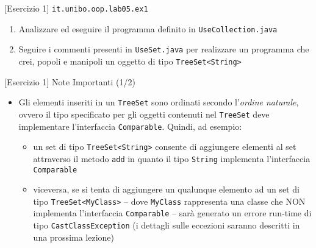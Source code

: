 \documentclass[presentation]{beamer}
\begin{document}

\begin{frame}{[Esercizio 1] \texttt{it.unibo.oop.lab05.ex1}}
\begin{enumerate}
\item Analizzare ed eseguire il programma definito in \texttt{UseCollection.java}
\item Seguire i commenti presenti in \texttt{UseSet.java} per realizzare un programma che crei, popoli e manipoli un oggetto di tipo \texttt{TreeSet<String>}
\end{enumerate}
\end{frame}

\begin{frame}{[Esercizio 1] Note Importanti (1/2)}
\begin{itemize}
\item Gli elementi inseriti in un \texttt{TreeSet} sono ordinati secondo l'\emph{ordine naturale}, ovvero il tipo specificato per gli oggetti contenuti nel \texttt{TreeSet} deve implementare l'interfaccia \texttt{Comparable}. Quindi, ad esempio:
\begin{itemize}
\item un set di tipo \texttt{TreeSet<String>} consente di aggiungere elementi al set attraverso il metodo \texttt{add} in quanto il tipo \texttt{String} implementa l'interfaccia \texttt{Comparable}
\item viceversa, se si tenta di aggiungere un qualunque elemento ad un set di tipo \texttt{TreeSet<MyClass>} -- dove \texttt{MyClass} rappresenta una classe che NON implementa l'interfaccia \texttt{Comparable} -- sarà generato un errore run-time di tipo \texttt{CastClassException} (i dettagli sulle eccezioni saranno descritti in una prossima lezione)
\end{itemize}
\end{itemize}
\end{frame}
\end{document}
